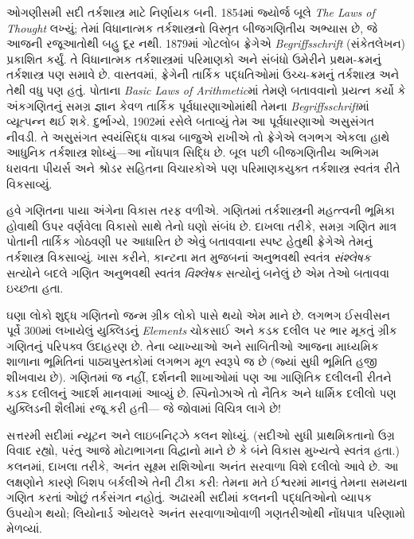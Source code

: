 ઓગણીસમી સદી તર્કશાસ્ત્ર માટે નિર્ણાયક બની. 1854માં
જ્યોર્જ બૂલે \emph{The Laws of Thought} લખ્યું;
તેમાં વિધાનાત્મક તર્કશાસ્ત્રનો વિસ્તૃત બીજગણિતીય અભ્યાસ
છે, જે આજની રજૂઆતોથી બહુ દૂર નથી. 1879માં ગોટલોબ
ફ્રેગેએ \emph{Begriffsschrift} (સંકેતલેખન) પ્રકાશિત
કર્યું. તે વિધાનાત્મક તર્કશાસ્ત્રમાં પરિમાણકો અને સંબંધો
ઉમેરીને પ્રથમ-ક્રમનું તર્કશાસ્ત્ર પણ સમાવે છે. વાસ્તવમાં,
ફ્રેગેની તાર્કિક પદ્ધતિઓમાં ઉચ્ચ-ક્રમનું તર્કશાસ્ત્ર અને
તેથી વધુ પણ હતું. પોતાના \emph{Basic Laws of
  Arithmetic}માં તેમણે બતાવવાનો પ્રયત્ન કર્યો કે
અંકગણિતનું સમગ્ર જ્ઞાન કેવળ તાર્કિક પૂર્વધારણાઓમાંથી
તેમના \emph{Begriffsschrift}માં વ્યૂત્પન્ન થઈ શકે.
દુર્ભાગ્યે, 1902માં રસેલે બતાવ્યું તેમ આ પૂર્વધારણાઓ
અસુસંગત નીવડી. તે અસુસંગત સ્વયંસિદ્ધ વાક્ય બાજુએ
રાખીએ તો ફ્રેગેએ લગભગ એકલા હાથે આધુનિક તર્કશાસ્ત્ર
શોધ્યું—આ નોંધપાત્ર સિદ્ધિ છે. બૂલ પછી બીજગણિતીય
અભિગમ ધરાવતા પીયર્સ અને શ્રોડર સહિતના વિચારકોએ પણ
પરિમાણકયુક્ત તર્કશાસ્ત્ર સ્વતંત્ર રીતે વિકસાવ્યું.

હવે ગણિતના પાયા અંગેના વિકાસ તરફ વળીએ. ગણિતમાં
તર્કશાસ્ત્રની મહત્ત્વની ભૂમિકા હોવાથી ઉપર વર્ણવેલા
વિકાસો સાથે તેનો ઘણો સંબંધ છે. દાખલા તરીકે, સમગ્ર
ગણિત માત્ર પોતાની તાર્કિક ગોઠવણી પર આધારિત છે એવું
બતાવવાના સ્પષ્ટ હેતુથી ફ્રેગેએ તેમનું તર્કશાસ્ત્ર
વિકસાવ્યું. ખાસ કરીને, કાન્ટના મત મુજબનાં અનુભવથી
સ્વતંત્ર \emph{સંશ્લેષક} સત્યોને બદલે ગણિત અનુભવથી
સ્વતંત્ર \emph{વિશ્લેષક} સત્યોનું બનેલું છે એમ તેઓ બતાવવા ઇચ્છતા હતા.

ઘણા લોકો શુદ્ધ ગણિતનો જન્મ ગ્રીક લોકો પાસે થયો એમ
માને છે. લગભગ ઈસવીસન પૂર્વે 300માં લખાયેલું યુક્લિડનું
\emph{Elements} ચોકસાઈ અને કડક દલીલ પર ભાર મૂકતું
ગ્રીક ગણિતનું પરિપક્વ ઉદાહરણ છે. તેના વ્યાખ્યાઓ અને
સાબિતીઓ આજના માધ્યમિક શાળાના ભૂમિતિનાં પાઠ્યપુસ્તકોમાં
લગભગ મૂળ સ્વરૂપે જ છે (જ્યાં સુધી ભૂમિતિ હજી શીખવાય છે).
ગણિતમાં જ નહીં, દર્શનની શાખાઓમાં પણ આ ગાણિતિક દલીલની
રીતને કડક દલીલનું આદર્શ માનવામાં આવ્યું છે. સ્પિનોઝાએ તો
નૈતિક અને ધાર્મિક દલીલો પણ યુક્લિડની શૈલીમાં રજૂ કરી હતી—
જે જોવામાં વિચિત્ર લાગે છે!

સત્તરમી સદીમાં ન્યૂટન અને લાઇબનિટ્ઝે કલન શોધ્યું.
(સદીઓ સુધી પ્રાથમિકતાનો ઉગ્ર વિવાદ રહ્યો, પરંતુ આજે
મોટાભાગના વિદ્વાનો માને છે કે બંને વિકાસ મુખ્યત્વે
સ્વતંત્ર હતા.) કલનમાં, દાખલા તરીકે, અનંત સૂક્ષ્મ
રાશિઓના અનંત સરવાળા વિશે દલીલો આવે છે. આ લક્ષણોને
કારણે બિશપ બર્કલીએ તેની ટીકા કરી: તેમના મતે ઈશ્વરમાં
માનવું તેમના સમયના ગણિત કરતાં ઓછું તર્કસંગત નહોતું.
અઢારમી સદીમાં કલનની પદ્ધતિઓનો વ્યાપક ઉપયોગ થયો;
લિયોનાર્ડ ઓયલરે અનંત સરવાળાઓવાળી ગણતરીઓથી નોંધપાત્ર
પરિણામો મેળવ્યાં.

